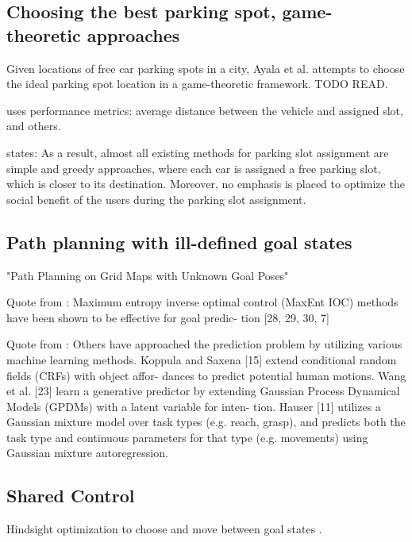 \subsection{Choosing the best parking spot, game-theoretic approaches}
Given locations of free car parking spots in a city, Ayala et al.
\cite{ayala2011parking} attempts to choose the ideal parking spot location
in a game-theoretic framework. TODO READ.
\cite{ayala2012parking}

\cite{mejri2014cooperation} uses performance metrics: average distance between
the vehicle and assigned slot, and others.

\cite{alfonsetti2014semi} states: 
As a result, almost all existing methods for parking slot assignment are simple
and greedy approaches, where each car is assigned a free parking slot, which is
closer to its destination. Moreover, no emphasis is placed to optimize the
social benefit of the users during the parking slot assignment. 

\subsection{Path planning with ill-defined goal states}
"Path Planning on Grid Maps with Unknown Goal Poses"

Quote from \cite{javdani2015shared}:
Maximum  entropy  inverse  optimal  control  (MaxEnt  IOC)
methods  have  been  shown  to  be  effective  for  goal  predic-
tion [28, 29, 30, 7]

Quote from \cite{javdani2015shared}:
Others have approached the prediction problem by utilizing
various machine learning methods. Koppula and Saxena [15]
extend  conditional  random  fields  (CRFs)  with  object  affor-
dances  to  predict  potential  human  motions.  Wang  et  al.  [23]
learn  a  generative  predictor  by  extending  Gaussian  Process
Dynamical Models (GPDMs) with a latent variable for inten-
tion. Hauser [11] utilizes a Gaussian mixture model over task
types  (e.g.  reach,  grasp),  and  predicts  both  the  task  type  and
continuous  parameters  for  that  type  (e.g.  movements)  using
Gaussian mixture autoregression.

\subsection{Shared Control}
Hindsight optimization to choose and move between goal states
\cite{javdani2015shared}.

